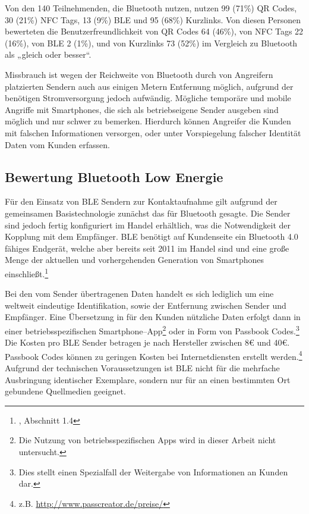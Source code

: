 Von den 140 Teilnehmenden, die Bluetooth nutzen, nutzen 99 (71\%) QR Codes, 30 (21\%) NFC Tags, 13 (9\%) \ac{BLE} und 95 (68\%) Kurzlinks. Von diesen Personen bewerteten die  Benutzerfreundlichkeit von QR Codes 64 (46\%), von NFC Tags 22 (16\%), von \ac{BLE} 2 (1\%), und von Kurzlinks 73 (52\%) im Vergleich zu Bluetooth als „gleich oder besser“.

Missbrauch ist wegen der Reichweite von Bluetooth durch von Angreifern platzierten Sendern auch aus einigen Metern Entfernung möglich, aufgrund der benötigen Stromversorgung jedoch aufwändig. Mögliche temporäre und mobile Angriffe mit Smartphones, die sich als betriebseigene Sender ausgeben sind möglich und nur schwer zu bemerken. Hierdurch können Angreifer die Kunden mit falschen Informationen versorgen, oder unter Vorspiegelung falscher Identität Daten vom Kunden erfassen.


\subsection{Bewertung Bluetooth Low Energie} %
\label{sub:bewertung_bluetooth_low_energie}
Für den Einsatz von \ac{BLE} Sendern zur Kontaktaufnahme gilt aufgrund der gemeinsamen Basistechnologie zunächst das für Bluetooth gesagte. Die Sender sind jedoch fertig konfiguriert im Handel erhältlich, was die Notwendigkeit der Kopplung mit dem Empfänger. \ac{BLE} benötigt auf Kundenseite ein Bluetooth 4.0 fähiges Endgerät, welche aber bereits seit 2011 im Handel sind und eine große Menge der aktuellen und vorhergehenden Generation von Smartphones einschließt.\footnote{\cite{gilchrist}, Abschnitt 1.4}

Bei den vom Sender übertragenen Daten handelt es sich lediglich um eine weltweit eindeutige Identifikation, sowie der Entfernung zwischen Sender und Empfänger. Eine Übersetzung in für den Kunden nützliche Daten erfolgt dann in einer betriebsspezifischen Smartphone–App\footnote{Die Nutzung von betriebsspezifischen Apps wird in dieser Arbeit nicht untersucht.} oder in Form von Passbook Codes.\footnote{Dies stellt einen Spezialfall der Weitergabe von Informationen an Kunden dar.} Die Kosten pro BLE Sender betragen je nach Hersteller zwischen 8€ und 40€. Passbook Codes können zu geringen Kosten bei Internetdiensten erstellt werden.\footnote{z.B. \url{http://www.passcreator.de/preise/}} Aufgrund der technischen Voraussetzungen ist \ac{BLE} nicht für die mehrfache Ausbringung identischer Exemplare, sondern nur für an einen bestimmten Ort gebundene Quellmedien geeignet. 


